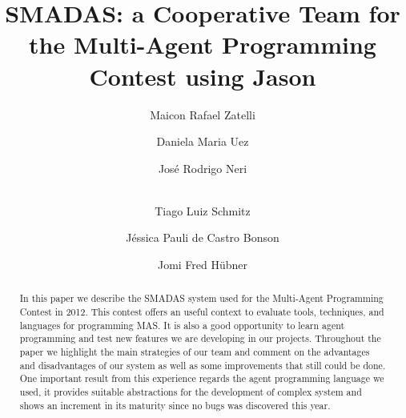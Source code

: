 \documentclass{llncs}
\begin{document}
\title{SMADAS: a Cooperative Team for the Multi-Agent Programming Contest using Jason}
\author{	Maicon Rafael Zatelli \and 
		Daniela Maria Uez \and
		Jos\'{e} Rodrigo Neri \and \\
		Tiago Luiz Schmitz \and
		J\'{e}ssica Pauli de Castro Bonson \and 
		Jomi Fred H\"{u}bner }
		


\maketitle
\begin{abstract} 
In this paper we describe the SMADAS system used for the Multi-Agent Programming Contest in 2012. This contest offers an useful context to evaluate tools, techniques, and languages for programming MAS. It is also a good opportunity to learn agent programming and test new features we are developing in our projects. Throughout the paper we highlight the main strategies of our team and comment on the advantages and disadvantages of our system as well as some improvements that still could be done. One important result from this experience regards the agent programming language we used, it provides suitable abstractions for the development of complex system and shows an increment in its maturity since no bugs was discovered this year.
\end{abstract}





\end{document}

